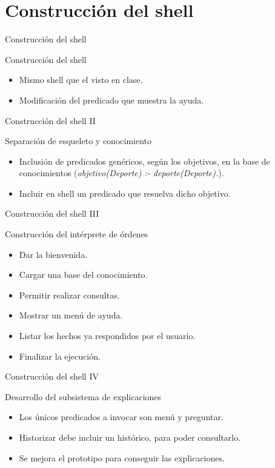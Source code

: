 \section{Construcción del shell}
\begin{frame}
\end{frame}

\begin{frame}{Construcción del shell}
 \begin{block}{Construcción del shell}
  \begin{itemize}
   \item Mismo shell que el visto en clase.
   \item Modificación del predicado que muestra la ayuda.
  \end{itemize}
 \end{block}
\end{frame}


\begin{frame}{Construcción del shell II}
 \begin{block}{Separación de esqueleto y conocimiento}
	\begin{itemize}
	\item Inclusión de predicados genéricos, según los objetivos, en la base de conocimientos (\emph{objetivo(Deporte) :- deporte(Deporte).}).
	\item Incluir en shell un predicado que resuelva dicho objetivo.
	\end{itemize}
 \end{block}
\end{frame}


\begin{frame}{Construcción del shell III}
 \begin{block}{Construcción del intérprete de órdenes}
	\begin{itemize}
	\item Dar la bienvenida.
	\item Cargar una base del conocimiento.
	\item Permitir realizar consultas.
	\item Mostrar un menú de ayuda.
	\item Listar los hechos ya respondidos por el usuario.
	\item Finalizar la ejecución.
	\end{itemize}
 \end{block}
\end{frame}


\begin{frame}{Construcción del shell IV}
 \begin{block}{Desarrollo del subsistema de explicaciones}
	\begin{itemize}
	\item Los únicos predicados a invocar son menú y preguntar.
	\item Historizar debe incluir un histórico, para poder consultarlo.
	\item Se mejora el prototipo para conseguir las explicaciones.
	\end{itemize}
 \end{block}
\end{frame}
